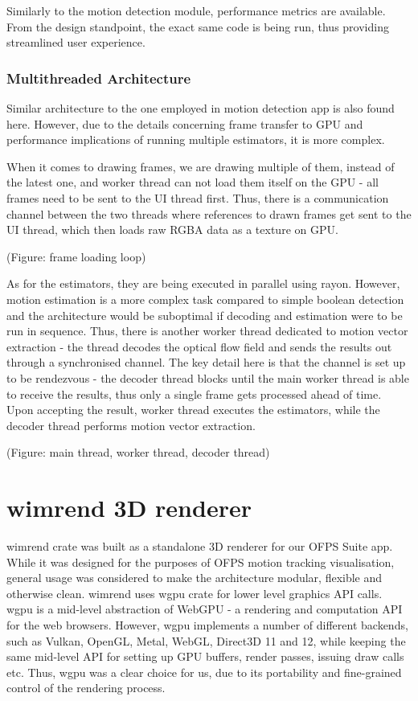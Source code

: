 \documentclass[11pt,english]{report}
\begin{document}
Similarly to the motion detection module, performance metrics are available. From the design standpoint, the exact same code is being run, thus providing streamlined user experience.

\subsubsection{Multithreaded Architecture}

Similar architecture to the one employed in motion detection app is also found here. However, due to the details concerning frame transfer to GPU and performance implications of running multiple estimators, it is more complex.

When it comes to drawing frames, we are drawing multiple of them, instead of the latest one, and worker thread can not load them itself on the GPU - all frames need to be sent to the UI thread first. Thus, there is a communication channel between the two threads where references to drawn frames get sent to the UI thread, which then loads raw RGBA data as a texture on GPU.

(Figure: frame loading loop)

As for the estimators, they are being executed in parallel using rayon. However, motion estimation is a more complex task compared to simple boolean detection and the architecture would be suboptimal if decoding and estimation were to be run in sequence. Thus, there is another worker thread dedicated to motion vector extraction - the thread decodes the optical flow field and sends the results out through a synchronised channel. The key detail here is that the channel is set up to be rendezvous\cite{rust_sync_channel} - the decoder thread blocks until the main worker thread is able to receive the results, thus only a single frame gets processed ahead of time. Upon accepting the result, worker thread executes the estimators, while the decoder thread performs motion vector extraction.

(Figure: main thread, worker thread, decoder thread)

\section{wimrend 3D renderer}

wimrend crate was built as a standalone 3D renderer for our OFPS Suite app. While it was designed for the purposes of OFPS motion tracking visualisation, general usage was considered to make the architecture modular, flexible and otherwise clean. wimrend uses wgpu crate for lower level graphics API calls. wgpu is a mid-level abstraction of WebGPU - a rendering and computation API for the web browsers. However, wgpu implements a number of different backends, such as Vulkan, OpenGL, Metal, WebGL, Direct3D 11 and 12, while keeping the same mid-level API for setting up GPU buffers, render passes, issuing draw calls etc. Thus, wgpu was a clear choice for us, due to its portability and fine-grained control of the rendering process.
\end{document}
